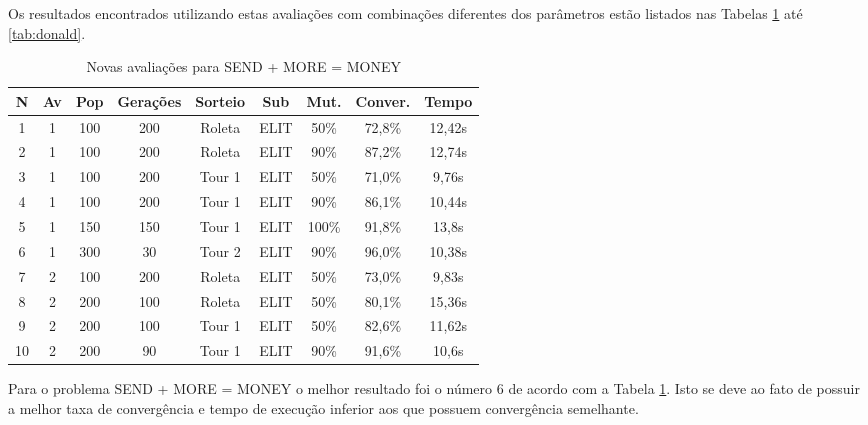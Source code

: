 \documentclass[a4paper, 12pt]{article}
\begin{document}
Os resultados encontrados utilizando estas avaliações com combinações diferentes
dos parâmetros estão listados nas Tabelas \ref{tab:send} até \ref{tab:donald}.

  \begin{table}[H]
    \centering
    \begin{tabular}{|c|c|c|c|c|c|c|c|c|}
      \hline
      N & Av & Pop & Gerações & Sorteio & Sub & Mut. & Conver. & Tempo  \\
      \hline
      1& 1 & 100 & 200 & Roleta & ELIT & 50\% &72,8\% & 12,42s \\
      \hline
      2& 1 & 100 & 200 & Roleta & ELIT & 90\% &87,2\% & 12,74s \\
      \hline
      3& 1 & 100 & 200 & Tour 1 & ELIT & 50\% &71,0\% & 9,76s \\
      \hline
      4& 1 & 100 & 200 & Tour 1 & ELIT & 90\% &86,1\% & 10,44s \\
      \hline
      5& 1 & 150 & 150 & Tour 1 & ELIT & 100\% &91,8\% & 13,8s \\
      \hline
      6& 1 & 300 & 30 & Tour 2 & ELIT & 90\% &96,0\% & 10,38s \\
      \hline
      7& 2 & 100 & 200 & Roleta & ELIT & 50\% &73,0\% & 9,83s \\
      \hline
      8& 2 & 200 & 100 & Roleta & ELIT & 50\% &80,1\% & 15,36s \\
      \hline
      9& 2 & 200 & 100 & Tour 1 & ELIT & 50\% &82,6\% & 11,62s \\
      \hline
      10& 2 & 200 & 90 & Tour 1 & ELIT & 90\% &91,6\% & 10,6s \\
      \hline
    \end{tabular}
    \caption{Novas avaliações para SEND + MORE = MONEY}
    \label{tab:send}
  \end{table}

  Para o problema SEND + MORE = MONEY o melhor resultado foi o número 6 de acordo
  com a Tabela \ref{tab:send}. Isto se deve ao fato de possuir a melhor taxa de
  convergência e tempo de execução inferior aos que possuem convergência semelhante.
\end{document}
